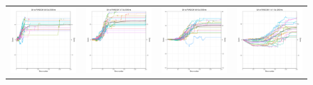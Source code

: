 \begin{figure}
\begin{tabular}{cccc}
\hspace{-0.5cm}\includegraphics[width = 1.55in]{images/Visualizations/GAvsRANDOM/2000ms5x5.png} &
\hspace{-0.5cm}\includegraphics[width = 1.55in]{images/Visualizations/GAvsRANDOM/2000ms7x7.png} &
\hspace{-0.5cm}\includegraphics[width = 1.55in]{images/Visualizations/GAvsRANDOM/2000ms9x9.png} &
\hspace{-0.5cm}\includegraphics[width = 1.55in]{images/Visualizations/GAvsRANDOM/2000ms11x11.png} \\


\end{tabular}
\end{figure}
